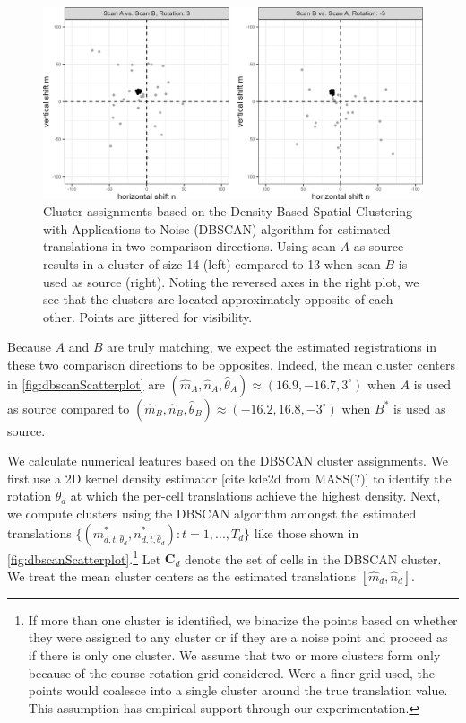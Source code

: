 \documentclass[
]{jdssv}
\begin{document}
\begin{CodeChunk}
\begin{figure}[htbp]

{\centering \includegraphics[width=.8\textwidth]{figures/dbscanScatterplot} 

}

\caption{\label{fig:dbscanScatterplot} Cluster assignments based on the Density Based Spatial Clustering with Applications to Noise (DBSCAN) algorithm for estimated translations in two comparison directions. Using scan $A$ as source results in a cluster of size 14 (left) compared to 13 when scan $B$ is used as source (right). Noting the reversed axes in the right plot, we see that the clusters are located approximately opposite of each other. Points are jittered for visibility.}\label{fig:unnamed-chunk-14}
\end{figure}
\end{CodeChunk}

Because \(A\) and \(B\) are truly matching, we expect the estimated
registrations in these two comparison directions to be opposites.
Indeed, the mean cluster centers in \autoref{fig:dbscanScatterplot} are
\((\hat{m}_A,\hat{n}_A,\hat{\theta}_A) \approx (16.9, -16.7, 3^\circ)\)
when \(A\) is used as source compared to
\((\hat{m}_B,\hat{n}_B,\hat{\theta}_B) \approx (-16.2, 16.8, -3^\circ)\)
when \(B^*\) is used as source.

We calculate numerical features based on the DBSCAN cluster assignments.
We first use a 2D kernel density estimator {[}cite kde2d from MASS(?){]}
to identify the rotation \(\hat{\theta}_d\) at which the per-cell
translations achieve the highest density. Next, we compute clusters
using the DBSCAN algorithm amongst the estimated translations
\(\{(m^*_{d,t,\hat{\theta}_d},n^*_{d,t,\hat{\theta}_d}) : t = 1,...,T_d\}\)
like those shown in
\autoref{fig:dbscanScatterplot}.\footnote{If more than one cluster is identified, we binarize the points based on whether they were assigned to any cluster or if they are a noise point and proceed as if there is only one cluster. We assume that two or more clusters form only because of the course rotation grid considered. Were a finer grid used, the points would coalesce into a single cluster around the true translation value. This assumption has empirical support through our experimentation.}
Let \(\pmb{C}_d\) denote the set of cells in the DBSCAN cluster. We
treat the mean cluster centers as the estimated translations
\([\hat{m}_d,\hat{n}_d]\).
\end{document}

